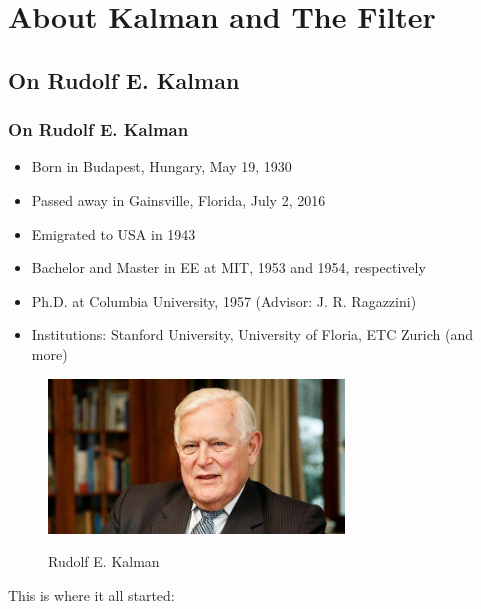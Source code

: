 \section{About Kalman and The Filter}

\subsection{On Rudolf E. Kalman}
\begin{frame}
   \frametitle{On Rudolf E. Kalman}

		\begin{itemize}
			\item Born in Budapest, Hungary, May 19, 1930
			\item Passed away in Gainsville, Florida, July 2, 2016
			\item Emigrated to USA in 1943
			\item Bachelor and Master in EE at MIT, 1953 and 1954, respectively
			\item Ph.D. at Columbia University, 1957 (Advisor: J. R. Ragazzini)
			\item Institutions: Stanford University, University of Floria, ETC Zurich (and more)
		\end{itemize}
		
		\begin{figure}
		\centering
			\includegraphics[width=0.70\textwidth]{Figures/Background/R. E. Kalman.jpg}
		\label{fig:REKalman}
		\caption{Rudolf E. Kalman}
	\end{figure}
	This is where it all started: \cite{Henrik_KF}	
\end{frame}

